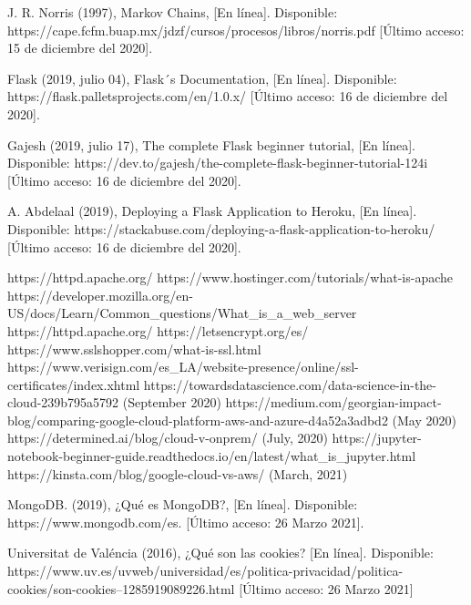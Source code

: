 \documentclass[12pt, a4paper, titlepage]{report}
\begin{document}
\begin{thebibliography}{20}
		J. R. Norris (1997), Markov Chains, [En línea]. Disponible: https://cape.fcfm.buap.mx/jdzf/cursos/procesos/libros/norris.pdf [Último acceso: 15 de diciembre del 2020].

		Flask (2019, julio 04), Flask´s Documentation, [En línea]. Disponible: https://flask.palletsprojects.com/en/1.0.x/ [Último acceso: 16 de diciembre del 2020].

		Gajesh (2019, julio 17), The complete Flask beginner tutorial, [En línea]. Disponible: https://dev.to/gajesh/the-complete-flask-beginner-tutorial-124i [Último acceso: 16 de diciembre del 2020].

		A. Abdelaal (2019), Deploying a Flask Application to Heroku, [En línea]. Disponible: https://stackabuse.com/deploying-a-flask-application-to-heroku/ [Último acceso: 16 de diciembre del 2020].
		
		https://httpd.apache.org/
		https://www.hostinger.com/tutorials/what-is-apache
		https://developer.mozilla.org/en-US/docs/Learn/Common_questions/What_is_a_web_server
		https://httpd.apache.org/
		https://letsencrypt.org/es/
		https://www.sslshopper.com/what-is-ssl.html
		https://www.verisign.com/es_LA/website-presence/online/ssl-certificates/index.xhtml
		https://towardsdatascience.com/data-science-in-the-cloud-239b795a5792 (September 2020)
		https://medium.com/georgian-impact-blog/comparing-google-cloud-platform-aws-and-azure-d4a52a3adbd2 (May 2020)
		https://determined.ai/blog/cloud-v-onprem/ (July, 2020)
		https://jupyter-notebook-beginner-guide.readthedocs.io/en/latest/what_is_jupyter.html 
		https://kinsta.com/blog/google-cloud-vs-aws/ (March, 2021)
    
    

	    
	    MongoDB. (2019), ¿Qué es MongoDB?, [En línea]. Disponible: https://www.mongodb.com/es. [Último acceso: 26 Marzo 2021].
        
        Universitat de Valéncia (2016), ¿Qué son las cookies? [En línea]. Disponible:           https://www.uv.es/uvweb/universidad/es/politica-privacidad/politica-cookies/son-cookies--1285919089226.html [Último acceso: 26 Marzo 2021]
        

\end{thebibliography}
\end{document}
